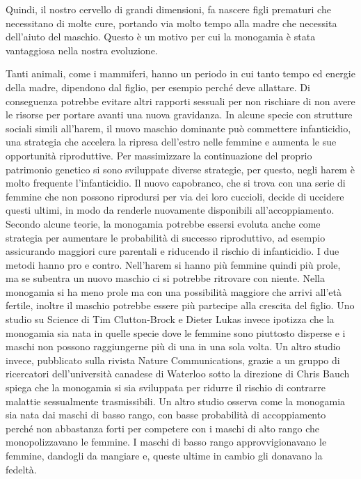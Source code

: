 \documentclass[12pt]{book} %
\begin{document}
Quindi, il nostro cervello di grandi dimensioni, fa nascere figli prematuri che necessitano di molte cure, portando via
molto tempo alla madre che necessita dell'aiuto del maschio. Questo è un motivo per cui la monogamia è stata vantaggiosa nella nostra evoluzione.

Tanti animali, come i mammiferi, hanno un periodo in cui tanto tempo ed energie della madre, dipendono dal figlio, per esempio perché deve
allattare. Di conseguenza potrebbe evitare altri rapporti sessuali per non rischiare di non avere le risorse per portare avanti una nuova gravidanza. In alcune specie con strutture sociali simili all’harem, il nuovo maschio dominante può commettere infanticidio, una strategia che accelera la ripresa dell’estro nelle femmine e aumenta le sue opportunità riproduttive. Per massimizzare
la continuazione del proprio patrimonio genetico si sono sviluppate diverse strategie, per questo, negli harem è molto
frequente l'infanticidio. Il nuovo capobranco, che si trova con una serie di femmine che non
possono riprodursi per via dei loro cuccioli, decide di uccidere questi ultimi, in modo da renderle nuovamente
disponibili all'accoppiamento. Secondo alcune teorie, la monogamia potrebbe essersi evoluta anche come strategia per aumentare le probabilità di successo riproduttivo, ad esempio assicurando maggiori cure parentali e riducendo il rischio di infanticidio. I due metodi
hanno pro e contro. Nell'harem si hanno più femmine quindi più prole, ma se subentra un nuovo
maschio ci si potrebbe ritrovare con niente. Nella monogamia si ha meno prole ma con una possibilità maggiore che arrivi
all'età fertile, inoltre il maschio potrebbe essere più partecipe alla crescita del figlio. Uno studio su
Science di Tim Clutton-Brock e Dieter Lukas invece ipotizza
che la monogamia sia nata in quelle specie dove le femmine sono piuttosto disperse e i maschi non possono raggiungerne
più di una in una sola volta. Un altro studio invece, pubblicato sulla rivista Nature Communications, grazie a un
gruppo di ricercatori dell'università canadese di Waterloo sotto la direzione di Chris Bauch
spiega che la monogamia si sia sviluppata per ridurre il rischio di contrarre malattie sessualmente
trasmissibili. Un altro studio osserva come la monogamia sia
nata dai maschi di basso rango, con basse probabilità di accoppiamento perché non abbastanza forti per competere con i
maschi di alto rango che monopolizzavano le femmine. I maschi di basso rango approvvigionavano le femmine, dandogli da
mangiare e, queste ultime in cambio gli donavano la fedeltà.
\end{document}
